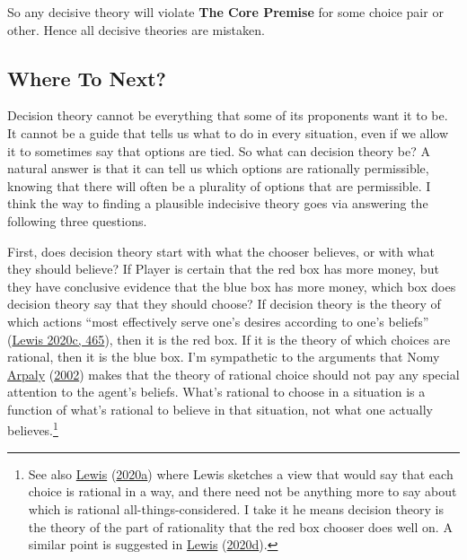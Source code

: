 \documentclass[
  12pt,
]{article}
\begin{document}
So any decisive theory will violate \textbf{The Core Premise} for some
choice pair or other. Hence all decisive theories are mistaken.

\hypertarget{where-to-next}{%
\subsection{Where To Next?}\label{where-to-next}}

Decision theory cannot be everything that some of its proponents want it
to be. It cannot be a guide that tells us what to do in every situation,
even if we allow it to sometimes say that options are tied. So what can
decision theory be? A natural answer is that it can tell us which
options are rationally permissible, knowing that there will often be a
plurality of options that are permissible. I think the way to finding a
plausible indecisive theory goes via answering the following three
questions.

First, does decision theory start with what the chooser believes, or
with what they should believe? If Player is certain that the red box has
more money, but they have conclusive evidence that the blue box has more
money, which box does decision theory say that they should choose? If
decision theory is the theory of which actions ``most effectively serve
one's desires according to one's beliefs''
(\protect\hyperlink{ref-Lewis-Price-17051988}{Lewis 2020c, 465}), then
it is the red box. If it is the theory of which choices are rational,
then it is the blue box. I'm sympathetic to the arguments that Nomy
\protect\hyperlink{ref-Arpaly2002}{Arpaly}
(\protect\hyperlink{ref-Arpaly2002}{2002}) makes that the theory of
rational choice should not pay any special attention to the agent's
beliefs. What's rational to choose in a situation is a function of
what's rational to believe in that situation, not what one actually
believes.\footnote{See also
  \protect\hyperlink{ref-Lewis-Mellor-14101981}{Lewis}
  (\protect\hyperlink{ref-Lewis-Mellor-14101981}{2020a}) where Lewis
  sketches a view that would say that each choice is rational in a way,
  and there need not be anything more to say about which is rational
  all-things-considered. I take it he means decision theory is the
  theory of the part of rationality that the red box chooser does well
  on. A similar point is suggested in
  \protect\hyperlink{ref-Lewis-Talbott-22061984}{Lewis}
  (\protect\hyperlink{ref-Lewis-Talbott-22061984}{2020d}).}
\end{document}
